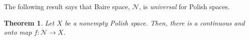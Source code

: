 \documentclass[12pt]{article}
\newtheorem*{theorem*}{Theorem}
\begin{document}

The following result says that Baire space, $\mathcal{N}$, is \emph{universal} for Polish spaces.

\begin{theorem*}
Let $X$ be a nonempty Polish space. Then, there is a continuous and onto map $f\colon\mathcal{N}\rightarrow X$.
\end{theorem*}

\end{document}
